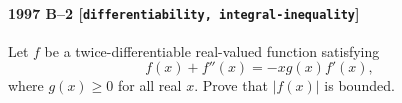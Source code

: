 \paragraph{1997 B--2 \textnormal{[\texttt{differentiability, integral-inequality}]}}
Let $f$ be a twice-differentiable real-valued function satisfying
\[
f(x)+f''(x)=-xg(x)f'(x),
\]
where $g(x)\geq 0$ for all real $x$. Prove that $|f(x)|$ is bounded.
